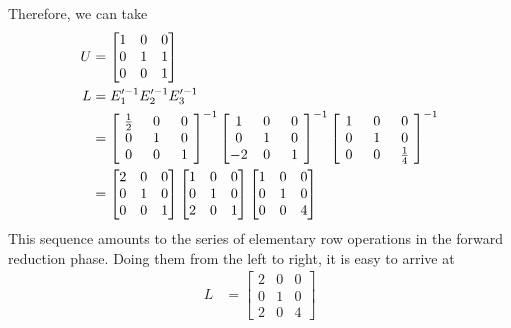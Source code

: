\begin{solution}
Therefore, we can take
\begin{align*}
U &= 
\begin{bmatrix}
1 & 0 & 0 \\
0 & 1 & 1 \\
0 & 0 & 1 
\end{bmatrix}
\\
L &= E_1'^{-1}E_2'^{-1}E_3'^{-1} \\
&=
\left[\begin{array}{@{\,}wc{10pt}wc{10pt}wc{10pt}@{\,}}
\frac{1}{2} & 0 & 0 \\
0 & 1 & 0 \\
0 & 0 & 1 
\end{array}\right]^{-1}
\left[\begin{array}{@{\,}wc{10pt}wc{10pt}wc{10pt}@{\,}}
1 & 0 & 0 \\
0 & 1 & 0 \\
-2 & 0 & 1 
\end{array}\right]^{-1}
\left[\begin{array}{@{\,}wc{10pt}wc{10pt}wc{10pt}@{\,}}
1 & 0 & 0 \\
0 & 1 & 0 \\
0 & 0 & \frac{1}{4} 
\end{array}\right]
^{-1} \\
&= \begin{bmatrix}
2 & 0 & 0 \\
0 & 1 & 0 \\
0 & 0 & 1 
\end{bmatrix}
\begin{bmatrix}
1 & 0 & 0 \\
0 & 1 & 0 \\
2 & 0 & 1 
\end{bmatrix}
\begin{bmatrix}
1 & 0 & 0 \\
0 & 1 & 0 \\
0 & 0 & 4 
\end{bmatrix}
\end{align*}
This sequence amounts to the series of elementary row operations in the forward reduction phase. Doing them from the left to right, it is easy to arrive at
\begin{align*}
L &=
\begin{bmatrix}
2 & 0 & 0 \\
0 & 1 & 0 \\
2 & 0 & 4
\end{bmatrix}
\end{align*}
\end{solution}

